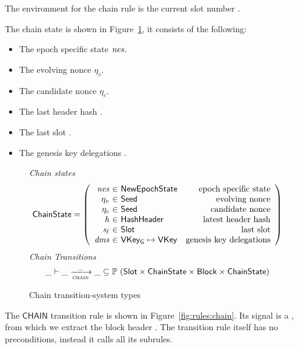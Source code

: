 The environment for the chain rule is the current slot number .

The chain state is shown in Figure~\ref{fig:ts-types:chain}, it consists of the
following:

\begin{itemize}
  \item The epoch specific state $\mathit{nes}$.
  \item The evolving nonce $\eta_v$.
  \item The candidate nonce $\eta_c$.
  \item The last header hash .
  \item The last slot .
  \item The genesis key delegations .
\end{itemize}

\begin{figure}
  \emph{Chain states}
  \begin{equation*}
    \ChainState =
    \left(
      \begin{array}{r@{~\in~}lr}
        \var{nes} & \NewEpochState & \text{epoch specific state} \\
        ~\eta_v & \Seed & \text{evolving nonce} \\
        ~\eta_c & \Seed & \text{candidate nonce} \\
        \var{h} & \HashHeader & \text{latest header hash} \\
        \var{s_\ell} & \Slot & \text{last slot} \\
        \var{dms} & \VKeyGen\mapsto\VKey & \text{genesis key delegations} \\
      \end{array}
    \right)
  \end{equation*}
  \emph{Chain Transitions}
  \begin{equation*}
    \_ \vdash \var{\_} \trans{chain}{\_} \var{\_} \subseteq
    \powerset (\Slot \times \ChainState \times \Block \times \ChainState)
  \end{equation*}
  \caption{Chain transition-system types}
  \label{fig:ts-types:chain}
\end{figure}

The $\mathsf{CHAIN}$ transition rule is shown in
Figure~\ref{fig:rules:chain}. Its signal is a , from which
we extract the block header .
The transition rule itself has no preconditions, instead it calls all its subrules.


